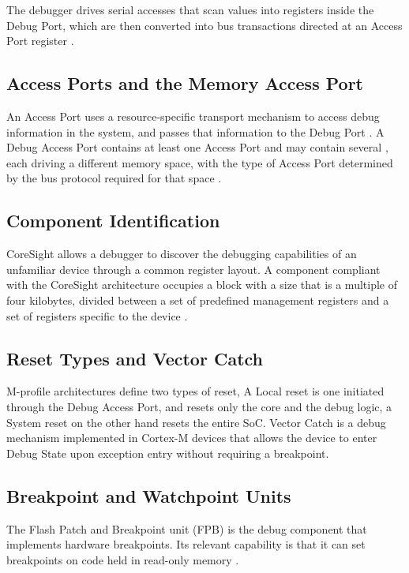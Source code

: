 The debugger drives serial accesses that scan values into registers inside the Debug Port, which are then converted into bus transactions directed at an Access Port register \cite{coresight_guide}.

\subsection{Access Ports and the Memory Access Port}
An Access Port uses a resource-specific transport mechanism to access debug information in the system, and passes that information to the Debug Port \cite{adiv5}. A Debug Access Port contains at least one Access Port and may contain several \cite{adiv5}, each driving a different memory space, with the type of Access Port determined by the bus protocol required for that space \cite{coresight_guide}.

\subsection{Component Identification}
CoreSight allows a debugger to discover the debugging capabilities of an unfamiliar device through a common register layout. A component compliant with the CoreSight architecture occupies a block with a size that is a multiple of four kilobytes, divided between a set of predefined management registers and a set of registers specific to the device \cite{coresight_guide}.

\subsection{Reset Types and Vector Catch}
\label{subsec:reset}
M-profile architectures define two types of reset, A Local reset is one initiated through the Debug Access Port, and resets only the core and the debug logic, a System reset on the other hand resets the entire SoC.
Vector Catch is a debug mechanism implemented in Cortex-M devices that allows the device to enter Debug State upon exception entry without requiring a breakpoint.
\subsection{Breakpoint and Watchpoint Units}
\label{subsec:fpb_dwt}

The Flash Patch and Breakpoint unit (FPB) is the debug component that implements hardware breakpoints. Its relevant capability is that it can set breakpoints on code held in read-only memory \cite{armv7m_arm}.

